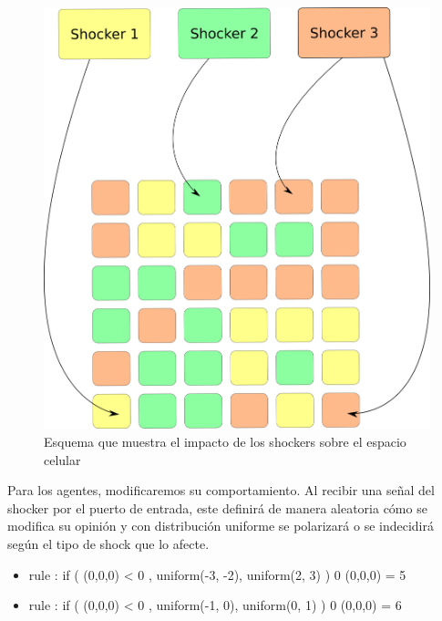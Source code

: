 \begin{figure}[!h]
\centering
\includegraphics[scale=0.5]{imagenes/agentes_celdas_modelo.png}
\caption{Esquema que muestra el impacto de los shockers sobre el espacio celular}
\label{fig:modelo_shockers}
\end{figure}

Para los agentes, modificaremos su comportamiento. Al recibir una señal del shocker por el puerto de entrada, este definirá de manera aleatoria cómo se modifica su opinión y con distribución uniforme se polarizará o se indecidirá según el tipo de shock que lo afecte.

\begin{itemize}
    \item[] rule : { if ( (0,0,0) < 0 , uniform(-3, -2), uniform(2, 3) ) } 0 { (0,0,0) = 5 }
    \item[] rule : { if ( (0,0,0) < 0 , uniform(-1, 0), uniform(0, 1) ) } 0 { (0,0,0) = 6 }
\end{itemize}




